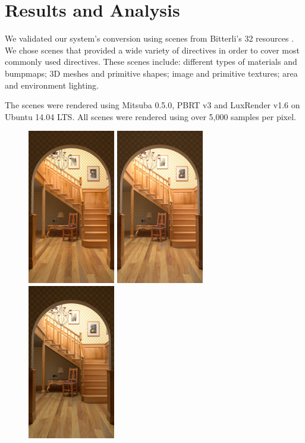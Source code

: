 \section{Results and Analysis}
We validated our system's conversion using scenes from Bitterli's 32 resources 
\cite{resources16}. We chose scenes that provided a wide variety of directives 
in order to cover most commonly used directives. These scenes include: different 
types of materials and bumpmaps; 3D meshes and primitive shapes; image and 
primitive textures; area and environment lighting. 

The scenes were rendered using Mitsuba 0.5.0, PBRT v3 and LuxRender v1.6 on 
Ubuntu 14.04 LTS. All scenes were rendered using over 5,000 samples per pixel. 

\begin{figure}
\centering
\includegraphics[width=1.5in]{figs/4_results/staircase/1_from_lux.png}
\includegraphics[width=1.5in]{figs/4_results/staircase/2_to_mitsuba.png}
\includegraphics[width=1.5in]{figs/4_results/staircase/3_to_pbrt.png}

\end{figure}
